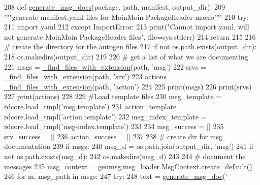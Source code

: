 \begin{DoxyCode}
208 \textcolor{keyword}{def }\hyperlink{namespacerosdoc__lite_1_1msgenator_a99725cc7a17d2af0c5b8ad68bec3cc4b}{generate\_msg\_docs}(package, path, manifest, output\_dir):
209     \textcolor{stringliteral}{"""generate manifest.yaml files for MoinMoin PackageHeader macro"""}
210     \textcolor{keywordflow}{try}:
211         \textcolor{keyword}{import} yaml
212     \textcolor{keywordflow}{except} ImportError:
213         print(\textcolor{stringliteral}{"Cannot import yaml, will not generate MoinMoin PackageHeader files"}, file=sys.stderr)
214         \textcolor{keywordflow}{return}
215 
216     \textcolor{comment}{# create the directory for the autogen files}
217     \textcolor{keywordflow}{if} \textcolor{keywordflow}{not} os.path.exists(output\_dir):
218         os.makedirs(output\_dir)
219 
220     \textcolor{comment}{# get a list of what we are documenting}
221     msgs = \hyperlink{namespacerosdoc__lite_1_1msgenator_a10e63ab0384c19aa19716060f76cefe5}{\_find\_files\_with\_extension}(path, \textcolor{stringliteral}{'msg'})
222     srvs = \hyperlink{namespacerosdoc__lite_1_1msgenator_a10e63ab0384c19aa19716060f76cefe5}{\_find\_files\_with\_extension}(path, \textcolor{stringliteral}{'srv'})
223     actions = \hyperlink{namespacerosdoc__lite_1_1msgenator_a10e63ab0384c19aa19716060f76cefe5}{\_find\_files\_with\_extension}(path, \textcolor{stringliteral}{'action'})
224 
225     print(msgs)
226     print(srvs)
227     print(actions)
228 
229     \textcolor{comment}{#Load template files}
230     msg\_template = rdcore.load\_tmpl(\textcolor{stringliteral}{'msg.template'})
231     action\_template = rdcore.load\_tmpl(\textcolor{stringliteral}{'action.template'})
232     msg\_index\_template = rdcore.load\_tmpl(\textcolor{stringliteral}{'msg-index.template'})
233 
234     msg\_success = []
235     srv\_success = []
236     action\_success = []
237 
238     \textcolor{comment}{# create dir for msg documentation}
239     \textcolor{keywordflow}{if} msgs:
240         msg\_d = os.path.join(output\_dir, \textcolor{stringliteral}{'msg'})
241         \textcolor{keywordflow}{if} \textcolor{keywordflow}{not} os.path.exists(msg\_d):
242             os.makedirs(msg\_d)
243 
244     \textcolor{comment}{# document the messages}
245     msg\_context = genmsg.msg\_loader.MsgContext.create\_default()
246     \textcolor{keywordflow}{for} m, msg\_path \textcolor{keywordflow}{in} msgs:
247         \textcolor{keywordflow}{try}:
248             text = \hyperlink{namespacerosdoc__lite_1_1msgenator_ab47d770be1a32293ef644c2771414b15}{generate\_msg\_doc}(\textcolor{stringliteral}{'%
}
\end{DoxyCode}
